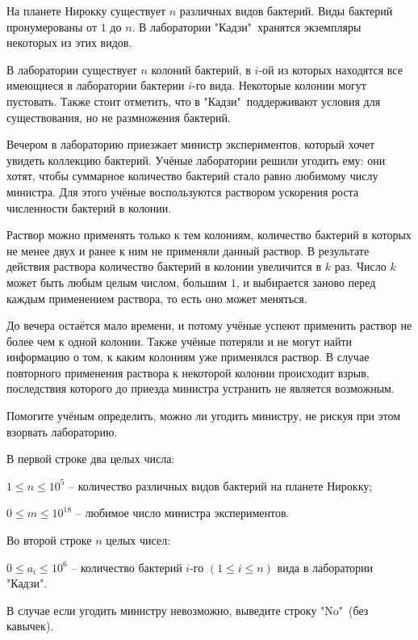 
На планете Нирокку существует $n$ различных видов бактерий. Виды бактерий пронумерованы от $1$ до $n$. В лаборатории "Кадзи"\ хранятся экземпляры некоторых из этих видов.

В лаборатории существует $n$ колоний бактерий, в $i$-ой из которых находятся все имеющиеся в лаборатории бактерии $i$-го вида. Некоторые колонии могут пустовать. Также стоит отметить, что в "Кадзи"\ поддерживают условия для существования, но не размножения бактерий.

Вечером в лабораторию приезжает министр экспериментов, который хочет увидеть коллекцию бактерий. Учёные лаборатории решили угодить ему: они хотят, чтобы суммарное количество бактерий стало равно любимому числу министра. Для этого учёные воспользуются раствором ускорения роста численности бактерий в колонии.

Раствор можно применять только к тем колониям, количество бактерий в которых не менее двух и ранее к ним не применяли данный раствор. В результате действия раствора количество бактерий в колонии увеличится в $k$ раз. Число $k$ может быть любым целым числом, большим $1$, и выбирается заново перед каждым применением раствора, то есть оно может меняться.

До вечера остаётся мало времени, и потому учёные успеют применить раствор не более чем к одной колонии. Также учёные потеряли и не могут найти информацию о том, к каким колониям уже применялся раствор. В случае повторного применения раствора к некоторой колонии происходит взрыв, последствия которого до приезда министра устранить не является возможным.

Помогите учёным определить, можно ли угодить министру, не рискуя при этом взорвать лабораторию.


В первой строке два целых числа:

$1 \le n \le 10^5$ -- количество различных видов бактерий на планете Нирокку;

$0 \le m \le 10^{18}$ -- любимое число министра экспериментов.

Во второй строке $n$ целых чисел:

$0 \le a_{i} \le 10^6$ -- количество бактерий $i$-го $(1 \le i \le n)$ вида в лаборатории "Кадзи".

\outputfmtSection

В случае если угодить министру невозможно, выведите строку "No"\ (без кавычек).

